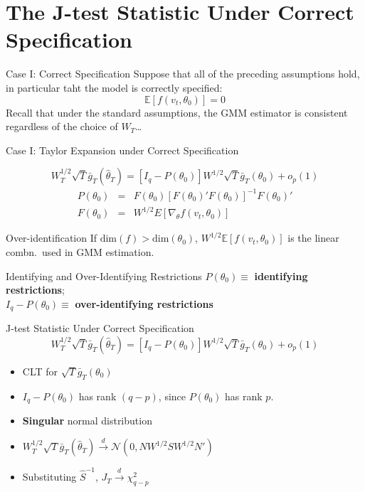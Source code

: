\section{The J-test Statistic Under Correct Specification}
\begin{frame}{Case I: Correct Specification} 
  Suppose that all of the preceding assumptions hold, in particular taht the model is \alert{correctly specified:}
  \[
    \mathbb{E}[f(v_t, \theta_0)] = 0
  \]
Recall that under the standard assumptions, the GMM estimator is consistent \alert{regardless of the choice of $W_T$\dots}
\end{frame}
\begin{frame}{Case I: Taylor Expansion under Correct Specification}

	$$W_T^{1/2} \sqrt{T} \bar{g}_T(\widehat{\theta}_T) = \left[I_q - P(\theta_0) \right]W^{1/2} \sqrt{T} \bar{g}_T(\theta_0) + o_p(1)$$
\footnotesize
\vspace{-2em}
	\begin{eqnarray*}
	P(\theta_0) &=& F(\theta_0) \left[F(\theta_0)' F(\theta_0) \right]^{-1} F(\theta_0)'\\
		F(\theta_0) &=& W^{1/2} E[\nabla_\theta f(v_t, \theta_0)]
	\end{eqnarray*}
  \normalsize

\begin{block}{Over-identification}
  If $\mbox{dim}(f) > \mbox{dim}(\theta_0)$, $W^{1/2} \mathbb{E}[f(v_t,\theta_0)]$ is the linear combn.\ used in GMM estimation.
\end{block}

\begin{block}{Identifying and Over-Identifying Restrictions}
$P(\theta_0) \equiv$ \textbf{identifying restrictions};\\ $I_q - P(\theta_0) \equiv$ \textbf{over-identifying restrictions}
\end{block}

\end{frame}
\begin{frame}{J-test Statistic Under Correct Specification}
	$$W_T^{1/2} \sqrt{T} \bar{g}_T(\widehat{\theta}_T) = \left[I_q - P(\theta_0) \right]W^{1/2} \sqrt{T} \bar{g}_T(\theta_0) + o_p(1)$$

  \begin{itemize}
    \item CLT for $\sqrt{T} \bar{g}_T(\theta_0)$
    \item $I_q - P(\theta_0)$ has rank $(q-p)$, since $P(\theta_0)$ has rank $p$.
    \item \textbf{Singular} normal distribution
	  \item $W_T^{1/2} \sqrt{T} \bar{g}_T(\widehat{\theta}_T) \overset{d}{\rightarrow} \mathcal{N}(0, NW^{1/2}S W^{1/2}N')$
    \item \alert{Substituting $\widehat{S}^{-1}$, $J_T \overset{d}{\rightarrow} \chi^2_{q-p}$}    
  \end{itemize}
\end{frame}

